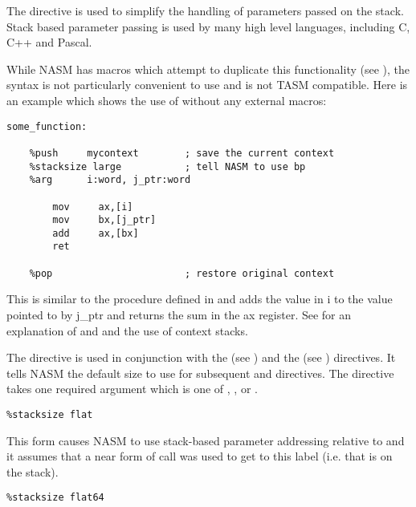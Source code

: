 
The  directive is used to simplify the handling of
parameters passed on the stack. Stack based parameter passing
is used by many high level languages, including C, C++ and Pascal.

While NASM has macros which attempt to duplicate this functionality
(see ), the syntax is not particularly convenient
to use and is not TASM compatible. Here is an example which shows the use
of  without any external macros:

\begin{lstlisting}
some_function:

    %push     mycontext        ; save the current context
    %stacksize large           ; tell NASM to use bp
    %arg      i:word, j_ptr:word

        mov     ax,[i]
        mov     bx,[j_ptr]
        add     ax,[bx]
        ret

    %pop                       ; restore original context
\end{lstlisting}

This is similar to the procedure defined in 
and adds the value in i to the value pointed to by j\_ptr and returns
the sum in the ax register. See  for an
explanation of  and  and the use of context stacks.


The  directive is used in conjunction with the
 (see ) and the 
(see ) directives. It tells NASM the default
size to use for subsequent  and  directives.
The  directive takes one required argument
which is one of , ,  or .

\begin{lstlisting}
%stacksize flat
\end{lstlisting}

This form causes NASM to use stack-based parameter addressing
relative to  and it assumes that a near form of call
was used to get to this label (i.e. that  is on the stack).

\begin{lstlisting}
%stacksize flat64
\end{lstlisting}

